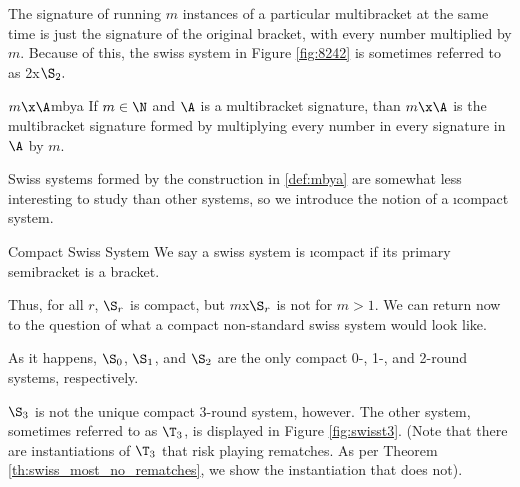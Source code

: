 {    

    The signature of running $m$ instances of a particular multibracket at the same time is just the signature of the original bracket, with every number multiplied by $m$. Because of this, the swiss system in Figure \ref{fig:8242} is sometimes referred to as 2x$\S_2.$

    \begin{definition}{$m\x\A$}{mbya}
        If $m \in \N$ and $\A$ is a multibracket signature, than $m\x\A$ is the multibracket signature formed by multiplying every number in every signature in $\A$ by $m$.
    \end{definition}

    Swiss systems formed by the construction in \ref{def:mbya} are somewhat less interesting to study than other systems, so we introduce the notion of a \i{compact} system.

    \begin{definition}{Compact Swiss System}{}
        We say a swiss system is \i{compact} if its primary semibracket is a bracket.
    \end{definition}

    Thus, for all $r$, $\S_r$ is compact, but $m$x$\S_r$ is not for $m > 1.$ We can return now to the question of what a compact non-standard swiss system would look like.

    As it happens, $\S_0$, $\S_1$, and $\S_2$ are the only compact 0-, 1-, and 2-round systems, respectively.


    $\S_3$ is not the unique compact $3$-round system, however. The other system, sometimes referred to as $\T_3$, is displayed in Figure \ref{fig:swisst3}. (Note that there are instantiations of $\T_3$ that risk playing rematches. As per Theorem \ref{th:swiss_most_no_rematches}, we show the instantiation that does not).

}

